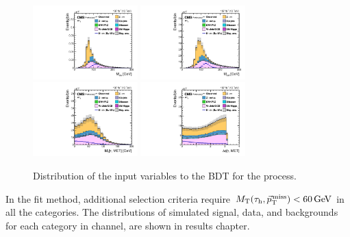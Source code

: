 \begin{figure}[htbp!]
  \includegraphics[width=0.36\textwidth]{plots/chapter6/etau/e_t_Mass.pdf}
  \includegraphics[width=0.36\textwidth]{plots/chapter6/etau/e_t_CollinearMass.pdf}\\
  \includegraphics[width=0.36\textwidth]{plots/chapter6/etau/MTTauMET.pdf}
  \includegraphics[width=0.36\textwidth]{plots/chapter6/etau/dPhiTauMET.pdf}\\
  \caption{Distribution of the input variables to the BDT for the \Hehad process.}
  \label{fig:input_et}
\end{figure}

In the \mcol fit method, additional selection criteria require $M_\mathrm{T}(\tau_{\text{h}}, {\vec p}_{\mathrm{T}}^{\kern1pt\text{miss}}) < 60\,\text{Ge\hspace{-.08em}V}$ in all the categories. The \mcol distributions of simulated signal, data, and backgrounds for each category in \Hehad channel, are shown in results chapter.

